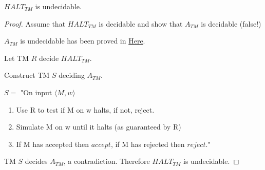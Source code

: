 \begin{theorem}
    \(HALT_{TM}\) is undecidable. 
\end{theorem}
\begin{proof}
    Assume that \(HALT_{TM}\) is decidable and show that \(A_{TM}\) is decidable (false!)  

    \(A_{TM} \) is undecidable has been proved in \hyperref[theorem: undecidable language]{Here}.

    Let TM \(R\) decide \(HALT_{TM}\).
    
    Construct TM \(S\) deciding \(A_{TM}\).  

    \(S = \) "On input \(\langle M, w \rangle\) 
        \begin{enumerate}
            \item Use R to test if M on w halts, if not, reject.
            \item Simulate M on w until it halts (as guaranteed by R)
            \item If M has accepted then \(accept\), if M has rejected then \(reject\)."
        \end{enumerate} 

    TM \(S\) decides \(A_{TM}\), a contradiction. Therefore \(HALT_{TM}\) is undecidable.   
\end{proof}


